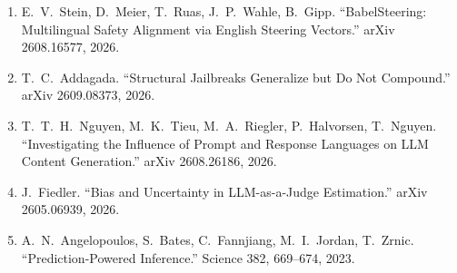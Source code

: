 \documentclass[11pt,letterpaper]{article}
\begin{document}
{\begin{enumerate}
\item E.~V.~Stein, D.~Meier, T.~Ruas, J.~P.~Wahle, B.~Gipp. ``BabelSteering: Multilingual Safety Alignment via English Steering Vectors.'' arXiv 2608.16577, 2026.
\item T.~C.~Addagada. ``Structural Jailbreaks Generalize but Do Not Compound.'' arXiv 2609.08373, 2026.
\item T.~T.~H.~Nguyen, M.~K.~Tieu, M.~A.~Riegler, P.~Halvorsen, T.~Nguyen. ``Investigating the Influence of Prompt and Response Languages on LLM Content Generation.'' arXiv 2608.26186, 2026.
\item J.~Fiedler. ``Bias and Uncertainty in LLM-as-a-Judge Estimation.'' arXiv 2605.06939, 2026.
\item A.~N.~Angelopoulos, S.~Bates, C.~Fannjiang, M.~I.~Jordan, T.~Zrnic. ``Prediction-Powered Inference.'' Science 382, 669--674, 2023.
\end{enumerate}
}
\end{document}
